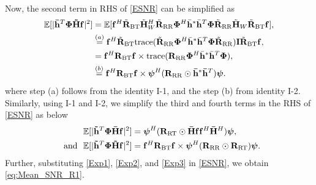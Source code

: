 \documentclass[journal,draftclsnofoot,onecolumn,12pt]{IEEEtran}
\begin{document}
Now, the second term in RHS of \eqref{ESNR} can be simplified as
\begingroup
\allowdisplaybreaks
\begin{align}
    \mathbb{E}[|\mathbf{\Bar{h}}^T\mathbf{\Phi}\mathbf{\Tilde{H}f}|^2] %
    &= \mathbb{E}[\mathbf{f}^H \Tilde{\mathbf{R}}_{\rm BT} \Tilde{\mathbf{H}}^H_W \Tilde{\mathbf{R}}_{\rm RR}\mathbf{\Phi}^H \Bar{\mathbf{h}}^* \Bar{\mathbf{h}}^T \mathbf{\Phi} \Tilde{\mathbf{R}}_{\rm RR} \Tilde{\mathbf{H}}_W \Tilde{\mathbf{R}}_{\rm BT}\mathbf{f}], \nonumber\\
     &\stackrel{(a)}{=}\mathbf{f}^H \Tilde{\mathbf{R}}_{\rm BT}{\rm trace}(\Tilde{\mathbf{R}}_{\rm RR}\mathbf{\Phi}^H \Bar{\mathbf{h}}^* \Bar{\mathbf{h}}^T \mathbf{\Phi} \Tilde{\mathbf{R}}_{\rm RR})  \mathbf{I}\Tilde{\mathbf{R}}_{\rm BT}\mathbf{f}, \nonumber\\
    &= \mathbf{f}^H\mathbf{R}_{\rm BT}\mathbf{f} \times {\rm trace}({\mathbf{R}}_{\rm RR}\mathbf{\Phi}^H \Bar{\mathbf{h}}^* \Bar{\mathbf{h}}^T \mathbf{\Phi}),\nonumber\\
    &\stackrel{(b)}{=}\mathbf{f}^H\mathbf{R}_{\rm BT}\mathbf{f} \times \boldsymbol{\psi}^H({\mathbf{R}}_{\rm RR} \odot \mathbf{\Bar{h}}^*\mathbf{\Bar{h}}^T)\boldsymbol{\psi}.\label{Exp1}
\end{align}
\endgroup
where   step (a) follows from the identity I-1, and the  step (b) from identity I-2. Similarly, using I-1 and I-2, we simplify the third and fourth terms in  the RHS of \eqref{ESNR} as below
\begin{align}
    \mathbb{E}[|\mathbf{\Tilde{h}}^T\mathbf{\Phi}\mathbf{\Bar{H}f}|^2] &=\boldsymbol{\psi}^H(\mathbf{R}_{\rm RT} \odot \mathbf{\Bar{H}f}\mathbf{f}^H\mathbf{\Bar{H}}^H)\boldsymbol{\psi},\label{Exp2}\\
   \text{~~and~~} \mathbb{E}[|\mathbf{\Tilde{h}}^T\mathbf{\Phi}\mathbf{\Tilde{H}f}|^2] 
    &=\mathbf{f}^H\mathbf{R}_{\rm BT}\mathbf{f} \times \boldsymbol{\psi}^H({\mathbf{R}}_{\rm RR} \odot \mathbf{R}_{\rm RT})\boldsymbol{\psi}.\label{Exp3}
\end{align}
Further, substituting \eqref{Exp1}, \eqref{Exp2}, and \eqref{Exp3} in \eqref{ESNR}, we obtain \eqref{eq:Mean_SNR_R1}.
\vspace{-.4cm}
\end{document}
